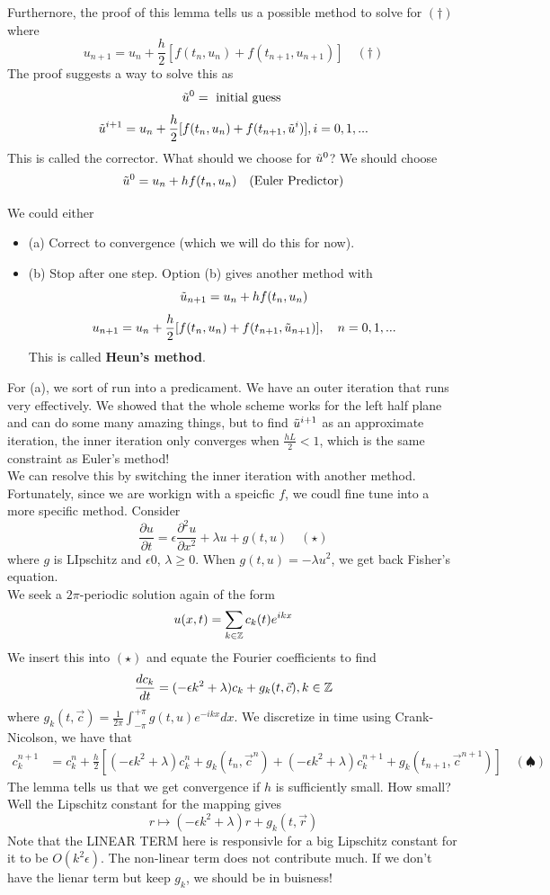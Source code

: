 \documentclass{article}
\begin{document}
Furthernore, the proof of this lemma tells us a possible method to solve for $(\dagger)$ where
\[u_{n+1} = u_n + \frac{h}{2} [f(t_n, u_n) + f(t_{n+1}, u_{n+1})] \quad (\dagger)\]
The proof suggests a way to solve this as
\[\Tilde{u}^0 = \text{ initial guess } \]
\[\Tilde{u}^{i+1} = u_n + \frac{h}{2} [f(t_n, u_n) + f(t_{n+1}, \Tilde{u}^i)], i = 0, 1, ...\]
This is called the corrector. What should we choose for $\Tilde{u}^0$? We should choose
\[\Tilde{u}^0 = u_n + h f(t_n, u_n) \quad (\text{Euler Predictor})\]

We could either
\begin{itemize}
    \item (a) Correct to convergence (which we will do this for now).
    \item (b) Stop after one step. Option (b) gives another method with
\[\Tilde{u}_{n+1} = u_n + h f(t_n, u_n)\]
\[u_{n+1} = u_n + \frac{h}{2} [f(t_n, u_n) + f(t_{n+1}, \Tilde{u}_{n+1})],\quad n = 0, 1, ...\]
This is called \textbf{Heun's method}.
\end{itemize}

For (a), we sort of run into a predicament. We have an outer iteration that runs very effectively. We showed that the whole scheme works for the left half plane and can do some many amazing things, but to find $\Tilde{u}^{i+1}$ as an approximate iteration, the inner iteration only converges when $\frac{hL}{2} < 1$, which is the same constraint as Euler's method!\\

We can resolve this by switching the inner iteration with another method. Fortunately, since we are workign with a speicfic $f$, we coudl fine tune into a more specific method. Consider
\[\frac{\partial u}{\partial t} = \epsilon \frac{\partial^2 u}{\partial x^2} + \lambda u + g(t, u) \quad (\star)\]
where $g$ is LIpschitz and $\epsilon  0$, $\lambda \geq 0$. When $g(t, u) = - \lambda u^2$, we get back Fisher's equation.\\

We seek a $2\pi$-periodic solution again of the form
\[u(x, t) = \sum_{k \in \mathbb{Z}} c_k(t) e^{ikx}\]
We insert this into $(\star)$ and equate the Fourier coefficients to find
\[\frac{d c_k}{dt} = (- \epsilon k^2 + \lambda) c_k + g_k(t, \Vec{c}), k \in \mathbb{Z}\]
where $g_k(t, \Vec{c}) = \frac{1}{2\pi} \int_{-\pi}^{+\pi} g(t, u) e^{-ikx} dx$. We discretize in time using Crank-Nicolson, we have that
\begin{align*}
    c_k^{n+1} &= c_k^n + \frac{h}{2} [(-\epsilon k^2 + \lambda) c_k^n + g_k(t_n, \Vec{c}^n) + (-\epsilon k^2 + \lambda) c_k^{n+1} + g_k(t_{n+1}, \Vec{c}^{n+1})] \quad (\spadesuit)
\end{align*}
The lemma tells us that we get convergence if $h$ is sufficiently small. How small? Well the Lipschitz constant for the mapping gives
\[r \mapsto (-\epsilon k^2 + \lambda) r + g_k(t, \Vec{r})\]
Note that the LINEAR TERM here is responsivle for a big Lipschitz constant for it to be $O(k^2 \epsilon)$. The non-linear term does not contribute much. If we don't have the lienar term but keep $g_k$, we should be in buisness!\\
\end{document}
